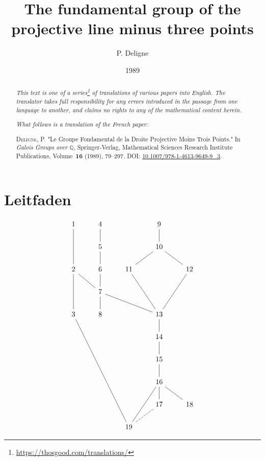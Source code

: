 \documentclass{article}
\title{The fundamental group of the projective line minus three points}
\author{P. Deligne}
\date{1989}
\begin{document}
\maketitle
\thispagestyle{fancy}

\renewcommand{\abstractname}{Translator's note.}

\begin{abstract}
  \renewcommand*{\thefootnote}{\fnsymbol{footnote}}
  \emph{This text is one of a series\footnote{\url{https://thosgood.com/translations/}} of translations of various papers into English.}
  \emph{The translator takes full responsibility for any errors introduced in the passage from one language to another, and claims no rights to any of the mathematical content herein.}

  \medskip
  
  \emph{What follows is a translation of the French paper:}

  \medskip\noindent
  \textsc{Deligne, P.}
  "Le Groupe Fondamental de la Droite Projective Moins Trois Points."
  In \emph{Galois Groups over $\mathbb{Q}$}, Springer-Verlag, Mathematical Sciences Research Institute Publications, Volume~\textbf{16} (1989), 79--297.
  \textsc{DOI:} \href{https://doi.org/10.1007/978-1-4613-9649-9_3}{10.1007/978-1-4613-9649-9\_3}.
\end{abstract}

\setcounter{footnote}{0}

\tableofcontents
\bigskip




\section*{Leitfaden}
\[
  \begin{tikzcd}
    1 \ar[dd, no head] & 4 \ar[d, no head] & & 9 \ar[d, no head] &
  \\& 5 \ar[d, no head] & & 10 \ar[dl, no head] \ar[dr, no head] &
  \\2 \ar[dd, no head] \ar[dr, no head] & 6 \ar[d, no head] & 11 \ar[ddr, no head] & & 12 \ar[ddl, no head]
  \\& 7 \ar[d, no head] \ar[drr, no head] & & &
  \\3 \ar[dddddrr, no head] & 8 & & 13 \ar[d, no head] &
  \\ & & & 14 \ar[d, no head] &
  \\ & & & 15 \ar[d, no head] &
  \\ & & & 16 \ar[d, no head] \ar[dr, no head] \ar[ddl, no head] &
  \\ & & & 17 \ar[dl, no head, dashed] & 18
  \\ & & 19 & &
  \end{tikzcd}
\]
\end{document}
